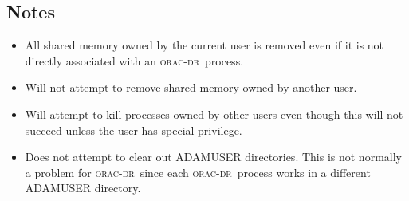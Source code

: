 \documentclass[twoside,11pt]{article}
\renewcommand{\_}{\texttt{\symbol{95}}}
\newcommand{\oracdr}{\textsc{orac-dr}}
\begin{document}
\subsection*{Notes\label{oracdr_nuke_NOTES}}\begin{itemize}
\item 

All shared memory owned by the current user is removed even if
it is not directly associated with an \oracdr\ process.

\item 

Will not attempt to remove shared memory owned by another user.

\item 

Will attempt to kill processes owned by other users even though
this will not succeed unless the user has special privilege.

\item 

Does not attempt to clear out ADAM\_USER directories. This is not
normally a problem for \oracdr\ since each \oracdr\ process works
in a different ADAM\_USER directory.

\end{itemize}


\end{document}
